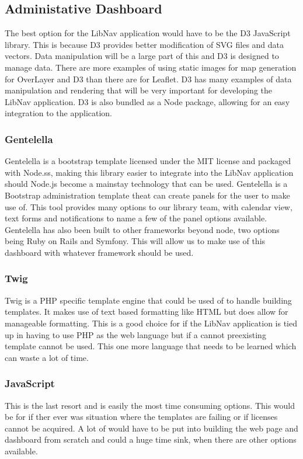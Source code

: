\documentclass[letterpaper,10pt,titlepage, onecolumn, compsoc]{IEEEtran}
\begin{document}
\subsection{Administative Dashboard}
The best option for the LibNav application would have to be the D3 JavaScript library. This is because D3 provides better modification of SVG files and data vectors. Data manipulation will be a large part of this and D3 is designed to manage data. There are more examples of using static images for map generation for OverLayer and D3 than there are for Leaflet. D3 has many examples of data manipulation and rendering that will be very important for developing the LibNav application. D3 is also bundled as a Node package, allowing for an easy integration to the application.
\subsubsection{Gentelella}
Gentelella is a bootstrap template licensed under the MIT license and packaged with Node.ss, making this library easier to integrate into the LibNav application should Node.js become a mainstay technology that can be used. Gentelella is a Bootstrap administration template theat can create panels for the user to make use of. This tool provides many options to our library team, with calendar view, text forms and notifications to name a few of the panel options available. Gentelella has also been built to other frameworks beyond node,  two options being Ruby on Rails and Symfony. This will allow us to make use of this dashboard with whatever framework should be used.\cite{Gentelella}
\subsubsection{Twig}
Twig is a PHP specific template engine that could be used of to handle building templates. It makes use of text based formatting like HTML but does allow for manageable formatting. This is a good choice for if the LibNav application is tied up in having to use PHP as the  web language but if a cannot preexisting template cannot be used. This one more language that needs to be learned which can waste a lot of time.\cite{twig}
\subsubsection{JavaScript}
This is the last resort and is easily the most time consuming options. This would be for if ther ever was situation where the templates are failing or if licenses cannot be acquired. A lot of would have to be put into building the web page and dashboard from scratch and could a huge time sink, when there are other options available.
\end{document}
